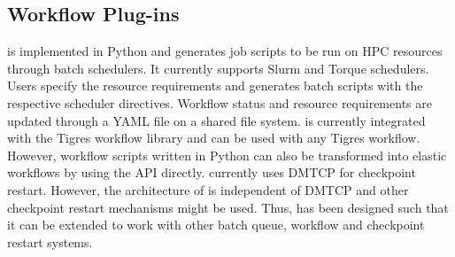 \subsection{Workflow Plug-ins}
\systemname is implemented in Python and generates job scripts to be
run on HPC resources through batch schedulers.
It currently supports Slurm and Torque schedulers. Users specify the
resource requirements and \systemname generates batch scripts with the
respective scheduler directives. Workflow status and resource
requirements are updated through a YAML file on a shared file
system. \systemname is currently integrated with the Tigres workflow
library and can be used with any Tigres workflow. However, workflow
scripts written in Python can also be transformed into elastic
workflows by using the \systemname API directly. 
\systemname currently uses DMTCP for checkpoint restart. However, the
architecture of \systemname is independent of DMTCP and other checkpoint
restart mechanisms might be used. Thus, \systemname has
been designed such that it can be extended to work with other batch
queue, workflow and checkpoint restart systems.


